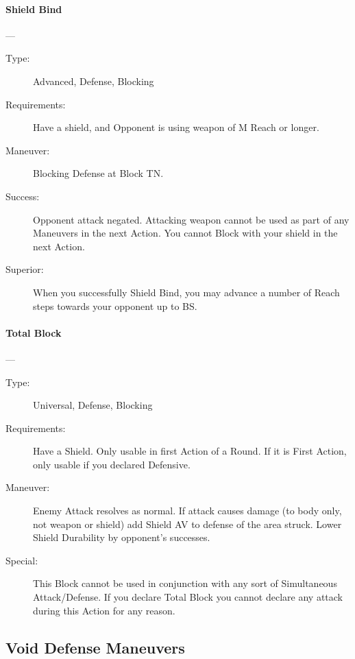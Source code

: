 \documentclass[oneside,11pt,english]{book}
\begin{document}
\paragraph{\large\label{man:Shield Bind}Shield Bind}---\quad{\large[X+1]}
\vspace{-10pt}\begin{description} 
\item [Type:] Advanced, Defense, Blocking 
\item [Requirements:] Have a shield, and Opponent is using weapon of M Reach or longer. 
\item [Maneuver:] Blocking Defense at Block TN. 
\item [Success:] Opponent attack negated. Attacking weapon cannot be used as part of any Maneuvers in the next 
  Action. You cannot Block with your shield in the next Action. 
\item [Superior:] When you successfully Shield Bind, you may advance a number of Reach steps towards your 
  opponent up to BS. 
\end{description}
\paragraph{\large\label{man:Total Block}Total Block}---
\vspace{-10pt}\begin{description} 
\item [Type:] Universal, Defense, Blocking 
\item [Requirements:] Have a Shield. Only usable in first Action of a Round. If it is First Action, only usable if 
  you declared Defensive. 
\item [Maneuver:] Enemy Attack resolves as normal. If attack causes damage (to body only, not weapon or 
  shield) add Shield AV to defense of the area struck. 
  Lower Shield Durability by opponent’s successes. 
\item [Special:] This Block cannot be used in conjunction with any sort of Simultaneous Attack/Defense. If you 
  declare Total Block you cannot declare any attack during this Action for any reason. 
\end{description}
\subsection{Void Defense Maneuvers}
\end{document}
